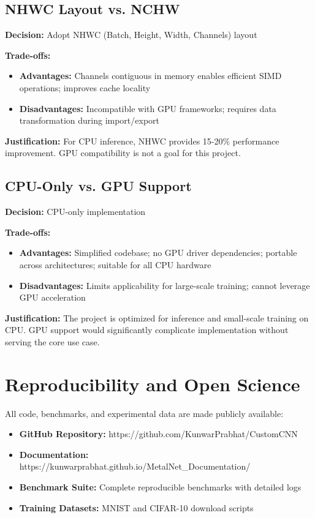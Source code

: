 \documentclass[12pt,oneside,a4paper]{report}
\begin{document}
\subsection{NHWC Layout vs. NCHW}

\textbf{Decision:} Adopt NHWC (Batch, Height, Width, Channels) layout

\textbf{Trade-offs:}
\begin{itemize}
    \item \textbf{Advantages:} Channels contiguous in memory enables efficient SIMD operations; improves cache locality
    \item \textbf{Disadvantages:} Incompatible with GPU frameworks; requires data transformation during import/export
\end{itemize}

\textbf{Justification:} For CPU inference, NHWC provides 15-20\% performance improvement. GPU compatibility is not a goal for this project.

\subsection{CPU-Only vs. GPU Support}

\textbf{Decision:} CPU-only implementation

\textbf{Trade-offs:}
\begin{itemize}
    \item \textbf{Advantages:} Simplified codebase; no GPU driver dependencies; portable across architectures; suitable for all CPU hardware
    \item \textbf{Disadvantages:} Limits applicability for large-scale training; cannot leverage GPU acceleration
\end{itemize}

\textbf{Justification:} The project is optimized for inference and small-scale training on CPU. GPU support would significantly complicate implementation without serving the core use case.

\section{Reproducibility and Open Science}

All code, benchmarks, and experimental data are made publicly available:

\begin{itemize}
    \item \textbf{GitHub Repository:} https://github.com/KunwarPrabhat/CustomCNN
    \item \textbf{Documentation:} https://kunwarprabhat.github.io/MetalNet\_Documentation/
    \item \textbf{Benchmark Suite:} Complete reproducible benchmarks with detailed logs
    \item \textbf{Training Datasets:} MNIST and CIFAR-10 download scripts
\end{itemize}
\end{document}
